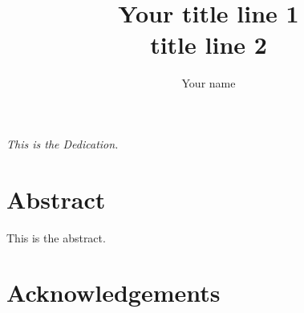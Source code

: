 \documentclass{unicam_thesis}
\title{Your title line 1\\title line 2}
\author{Your name}%
\theoremstyle{definition} \newtheorem{esempio}{Esempio}[chapter]
\theoremstyle{definition}
\begin{document}
    
    
    \frontmatter
    
    \maketitle
    
    
       
    
    
    
    \thispagestyle{empty}
    \clearpage
    \null{}
    \begin{flushright}
        \itshape
        This is the Dedication.
    \end{flushright}
    \null
    
    
    
    
    

    \clearpage
    \chapter*{Abstract}
    
    This is the abstract.
    
    \newpage
    
   
    
    
    
    
    
    
    \clearpage
    \chapter*{Acknowledgements}
   
\end{document}
